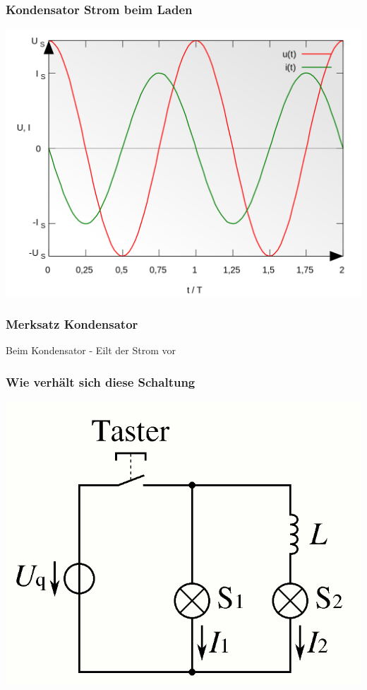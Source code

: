 \begin{frame}
    \frametitle{Kondensator Strom beim Laden}
	\begin{center}
        \includegraphics[width=1\textwidth]{a03/Sinus_Voltage_and_Current_of_a_Capacitor.png}
        \tiny \hyperlink{refs}{\cite{wc}}
    \end{center}
\end{frame}

\begin{frame}
\frametitle{Merksatz Kondensator}
\begin{center}
		\huge{Beim Kondensator - Eilt der Strom vor}
\end{center}
\end{frame}

\begin{frame}
    \frametitle{Wie verhält sich diese Schaltung}
	\begin{center}
        \includegraphics[width=.8\textwidth]{a03/Spulenstrom.png}
        \tiny \hyperlink{refs}{\cite{wc}}
    \end{center}
\end{frame}

